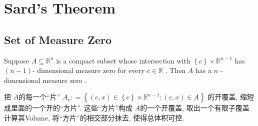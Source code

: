\documentclass[../main.tex]{subfiles}
\begin{document}
\ifSubfilesClassLoaded{

    \tableofcontents
    
}{}

\chapter{ Sard's Theorem }

\section{Set of Measure Zero}

\begin{lemma}{}{}
    Suppose \(  A\subseteq \mathbb{R} ^{n}  \) is a compact subset whose intersection with \(  \left\{ c \right\} \times \mathbb{R} ^{n-1}  \) has \(  \left( n-1 \right)   \)- dimensional measure zero for every \(  c \in \mathbb{R}   \) .  Then \(  A  \) has a \(  n  \) - dimensional measure zero .       
\end{lemma}

\begin{proofsketch}
    把 \(  A  \)的每一个``片'' \(  A_{c}: = \left\{ \left( c,x \right)\in \left\{ c \right\} \times \mathbb{R} ^{n-1}: \left( c,x \right) \in A   \right\}  \)  的开覆盖, 缩短成里面的一个开的``方片''.  这些``方片''构成 \(  A  \)的一个开覆盖, 取出一个有限子覆盖计算其Volume, 将``方片''的相交部分抹去, 使得总体积可控.  
\end{proofsketch}
\end{document}
